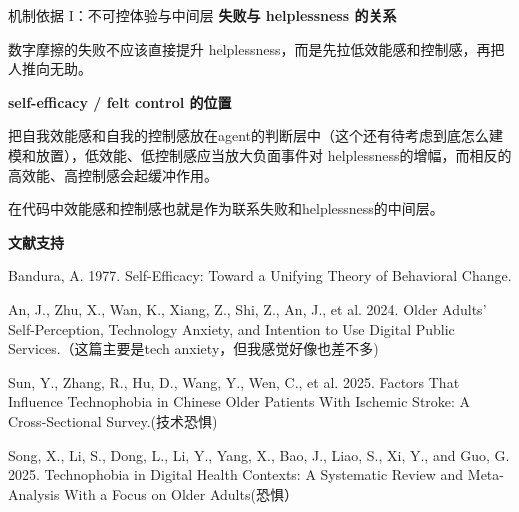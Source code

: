 \documentclass[aspectratio=169]{beamer}
\begin{document}
\begin{frame}[t]{机制依据 I：不可控体验与中间层}
\tiny
\justifying
\textbf{失败与 helplessness 的关系}

数字摩擦的失败不应该直接提升 helplessness，而是先拉低效能感和控制感，再把人推向无助。

\vspace{0.15cm}
\textbf{self-efficacy / felt control 的位置}

把自我效能感和自我的控制感放在agent的判断层中（这个还有待考虑到底怎么建模和放置），低效能、低控制感应当放大负面事件对 helplessness的增幅，而相反的高效能、高控制感会起缓冲作用。

在代码中效能感和控制感也就是作为联系失败和helplessness的中间层。

\vspace{0.18cm}
\textbf{文献支持}

Bandura, A. 1977. Self-Efficacy: Toward a Unifying Theory of Behavioral Change.

An, J., Zhu, X., Wan, K., Xiang, Z., Shi, Z., An, J., et al. 2024. Older Adults' Self-Perception, Technology Anxiety, and Intention to Use Digital Public Services.（这篇主要是tech anxiety，但我感觉好像也差不多)

Sun, Y., Zhang, R., Hu, D., Wang, Y., Wen, C., et al. 2025. Factors That Influence Technophobia in Chinese Older Patients With Ischemic Stroke: A Cross-Sectional Survey.(技术恐惧)

Song, X., Li, S., Dong, L., Li, Y., Yang, X., Bao, J., Liao, S., Xi, Y., and Guo, G. 2025. Technophobia in Digital Health Contexts: A Systematic Review and Meta-Analysis With a Focus on Older Adults(恐惧）
\end{frame}
\end{document}

